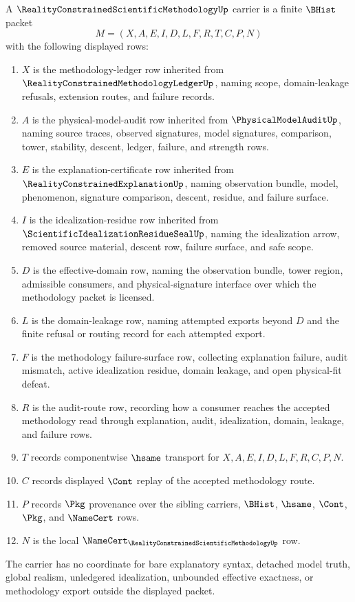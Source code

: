 \begin{definition}
\label{def:reality-constrained-scientific-methodology-carrier}
A $\RealityConstrainedScientificMethodologyUp$ carrier is a finite $\BHist$ packet
$$
M=(X,A,E,I,D,L,F,R,T,C,P,N)
$$
with the following displayed rows:
\begin{enumerate}
\item $X$ is the methodology-ledger row inherited from $\RealityConstrainedMethodologyLedgerUp$, naming scope, domain-leakage refusals, extension routes, and failure records.
\item $A$ is the physical-model-audit row inherited from $\PhysicalModelAuditUp$, naming source traces, observed signatures, model signatures, comparison, tower, stability, descent, ledger, failure, and strength rows.
\item $E$ is the explanation-certificate row inherited from $\RealityConstrainedExplanationUp$, naming observation bundle, model, phenomenon, signature comparison, descent, residue, and failure surface.
\item $I$ is the idealization-residue row inherited from $\ScientificIdealizationResidueSealUp$, naming the idealization arrow, removed source material, descent row, failure surface, and safe scope.
\item $D$ is the effective-domain row, naming the observation bundle, tower region, admissible consumers, and physical-signature interface over which the methodology packet is licensed.
\item $L$ is the domain-leakage row, naming attempted exports beyond $D$ and the finite refusal or routing record for each attempted export.
\item $F$ is the methodology failure-surface row, collecting explanation failure, audit mismatch, active idealization residue, domain leakage, and open physical-fit defeat.
\item $R$ is the audit-route row, recording how a consumer reaches the accepted methodology read through explanation, audit, idealization, domain, leakage, and failure rows.
\item $T$ records componentwise $\hsame$ transport for $X,A,E,I,D,L,F,R,C,P,N$.
\item $C$ records displayed $\Cont$ replay of the accepted methodology route.
\item $P$ records $\Pkg$ provenance over the sibling carriers, $\BHist$, $\hsame$, $\Cont$, $\Pkg$, and $\NameCert$ rows.
\item $N$ is the local $\NameCert_{\RealityConstrainedScientificMethodologyUp}$ row.
\end{enumerate}
The carrier has no coordinate for bare explanatory syntax, detached model truth, global realism, unledgered idealization, unbounded effective exactness, or methodology export outside the displayed packet.
\end{definition}

